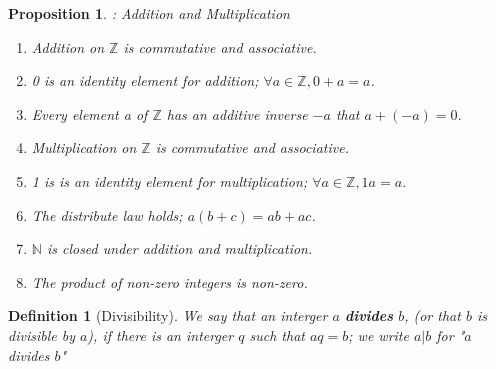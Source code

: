 \documentclass[12pt]{article}
\newtheorem{definition}{Definition}[subsection]
\newtheorem{proposition}{Proposition}[subsection]
\begin{document}
    \begin{proposition} : Addition and Multiplication\\
        \begin{enumerate}
            \item Addition on $\mathbb{Z}$ is commutative and associative.
            \item 0 is an identity element for addition; $\forall a \in \mathbb{Z}, 0+a=a$.
            \item Every element a of $\mathbb{Z}$ has an additive inverse $-a$ that  $a + (-a) = 0$.
            \item Multiplication on $\mathbb{Z}$ is commutative and associative.
            \item 1 is is an identity element for multiplication; $\forall a \in \mathbb{Z}, 1a = a$.
            \item The distribute law holds; $a(b + c) = ab + ac$.
            \item $\mathbb{N}$ is closed under addition and multiplication.
            \item The product of non-zero integers is non-zero.
        \end{enumerate}
    \end{proposition}
    
    \begin{definition}[Divisibility]
        We say that an interger $a$ \textbf{divides} $b$, (or that $b$ is divisible by $a$), if there is an interger $q$ such that $aq = b$; we write $a|b$ for "$a$ divides $b$"
    \end{definition}
\end{document}
